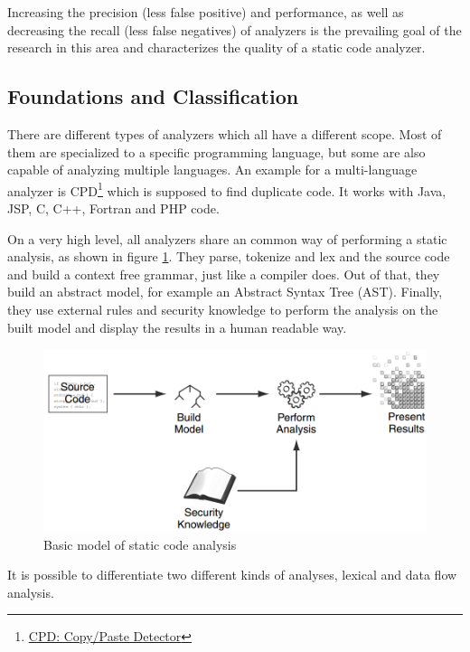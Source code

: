 \documentclass[conference]{IEEEtran}
\begin{document}
Increasing the precision (less false positive) and performance, as well as decreasing the recall (less false negatives) of analyzers is the prevailing goal of the research in this area and characterizes the quality of a static code analyzer.


\subsection{Foundations and Classification}
There are different types of analyzers which all have a different scope. Most of them are specialized to a specific programming language, but some are also capable of analyzing multiple languages. An example for a multi-language analyzer is CPD\footnote{\href{http://pmd.sourceforge.net/pmd-4.3.0/cpd.html}{CPD: Copy/Paste Detector}} which is supposed to find duplicate code. It works with Java, JSP, C, C++, Fortran and PHP code.


On a very high level, all analyzers share an common way of performing a static analysis, as shown in figure \ref{fig:analysis}.
They parse, tokenize and lex and the source code and build a context free grammar, just like a compiler does.
Out of that, they build an abstract model, for example an Abstract Syntax Tree (AST).
Finally, they use external rules and security knowledge to perform the analysis on the built model and display the results in a human readable way.

\begin{figure}[!t]
	\centering
	\includegraphics[width=1\linewidth]{img/analysis.png}
	\caption{Basic model of static code analysis \cite{Static_code_analysis_book_Chess:2007}}
	\label{fig:analysis}
\end{figure}

It is possible to differentiate two different kinds of analyses, lexical and data flow analysis.
\end{document}
